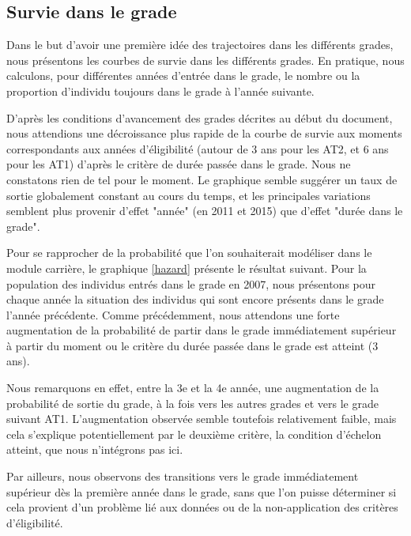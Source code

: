 \documentclass[11pt,a4paper]{article}
\begin{document}
\medskip









\subsection{Survie dans le grade}


Dans le but d'avoir une première idée des trajectoires dans les différents grades, nous présentons les courbes de survie dans les différents grades. En pratique, nous calculons, pour différentes années d'entrée dans le grade, le nombre ou la proportion d'individu toujours dans le grade à l'année suivante. 

D'après les conditions d'avancement des grades décrites au début du document, nous attendions une décroissance plus rapide de la courbe de survie aux moments correspondants aux années d'éligibilité (autour de 3 ans pour les AT2, et 6 ans pour les AT1) d'après le critère de durée passée dans le grade. Nous ne constatons rien de tel pour le moment. Le graphique semble suggérer un taux de sortie globalement constant au cours du temps, et les principales variations semblent plus provenir d'effet "année" (en 2011 et 2015) que d'effet "durée dans le grade". 

\medskip

Pour se rapprocher de la probabilité que l'on souhaiterait modéliser dans le module carrière, le graphique \ref{hazard} présente le résultat suivant. Pour la population des individus entrés dans le grade en 2007, nous présentons pour chaque année la situation des individus qui sont encore présents dans le grade l'année précédente. Comme précédemment, nous attendons une forte augmentation de la probabilité de partir dans le grade immédiatement supérieur à partir du moment ou le critère du durée passée dans le grade est atteint (3 ans). 

Nous remarquons en effet, entre la 3e et la 4e année, une augmentation de la probabilité de sortie du grade, à la fois vers les autres grades et vers le grade suivant AT1. L'augmentation observée semble toutefois relativement faible, mais cela s'explique potentiellement par le deuxième critère, la condition d'échelon atteint, que nous n'intégrons pas ici. 

Par ailleurs, nous observons des transitions vers le grade immédiatement supérieur dès la première année dans le grade, sans que l'on puisse déterminer si cela provient d'un problème lié aux données ou de la non-application des critères d'éligibilité. 
\end{document}
